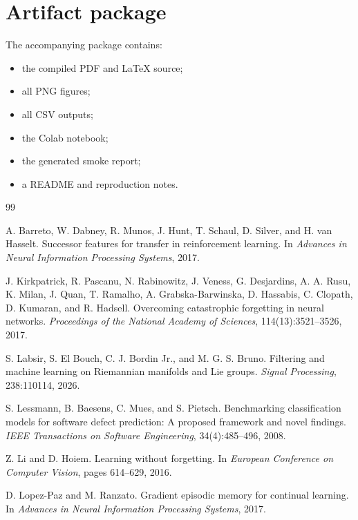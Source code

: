 \documentclass[11pt,a4paper]{article}
\begin{document}
\section*{Artifact package}
The accompanying package contains:
\begin{itemize}[leftmargin=*]
    \item the compiled PDF and LaTeX source;
    \item all PNG figures;
    \item all CSV outputs;
    \item the Colab notebook;
    \item the generated smoke report;
    \item a README and reproduction notes.
\end{itemize}

\begin{thebibliography}{99}

A. Barreto, W. Dabney, R. Munos, J. Hunt, T. Schaul, D. Silver, and H. van Hasselt.
\newblock Successor features for transfer in reinforcement learning.
\newblock In \emph{Advances in Neural Information Processing Systems}, 2017.

J. Kirkpatrick, R. Pascanu, N. Rabinowitz, J. Veness, G. Desjardins, A. A. Rusu, K. Milan, J. Quan, T. Ramalho, A. Grabska-Barwinska, D. Hassabis, C. Clopath, D. Kumaran, and R. Hadsell.
\newblock Overcoming catastrophic forgetting in neural networks.
\newblock \emph{Proceedings of the National Academy of Sciences}, 114(13):3521--3526, 2017.

S. Labsir, S. El Bouch, C. J. Bordin Jr., and M. G. S. Bruno.
\newblock Filtering and machine learning on Riemannian manifolds and Lie groups.
\newblock \emph{Signal Processing}, 238:110114, 2026.

S. Lessmann, B. Baesens, C. Mues, and S. Pietsch.
\newblock Benchmarking classification models for software defect prediction: A proposed framework and novel findings.
\newblock \emph{IEEE Transactions on Software Engineering}, 34(4):485--496, 2008.

Z. Li and D. Hoiem.
\newblock Learning without forgetting.
\newblock In \emph{European Conference on Computer Vision}, pages 614--629, 2016.

D. Lopez-Paz and M. Ranzato.
\newblock Gradient episodic memory for continual learning.
\newblock In \emph{Advances in Neural Information Processing Systems}, 2017.


\end{thebibliography}
\end{document}
